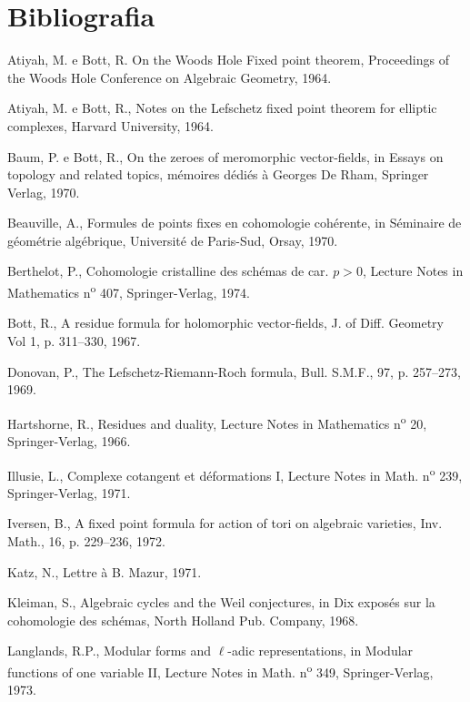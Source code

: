 \section*{Bibliografia}
\begin{enumerate}[label={[\arabic*]},leftmargin=3.5em]
\item Atiyah, M. e Bott, R. On the Woods Hole Fixed point theorem, Proceedings of the Woods Hole Conference on Algebraic Geometry, 1964.
\item Atiyah, M. e Bott, R., Notes on the Lefschetz fixed point theorem for elliptic complexes, Harvard University, 1964.
\item Baum, P. e Bott, R., On the zeroes of meromorphic vector-fields, in Essays on topology and related topics, mémoires dédiés à Georges De Rham, Springer Verlag, 1970.
\item Beauville, A., Formules de points fixes en cohomologie cohérente, in Séminaire de géométrie algébrique, Université de Paris-Sud, Orsay, 1970.
\item Berthelot, P., Cohomologie cristalline des schémas de car. $p>0$, Lecture Notes in Mathematics n\textsuperscript{o} 407, Springer-Verlag, 1974.
\item Bott, R., A residue formula for holomorphic vector-fields, J. of Diff. Geometry Vol 1, p. 311--330, 1967.
\item Donovan, P., The Lefschetz-Riemann-Roch formula, Bull. S.M.F., 97, p. 257--273, 1969.
\item Hartshorne, R., Residues and duality, Lecture Notes in Mathematics n\textsuperscript{o} 20, Springer-Verlag, 1966.
\item Illusie, L., Complexe cotangent et déformations I, Lecture Notes in Math. n\textsuperscript{o} 239, Springer-Verlag, 1971.
\item Iversen, B., A fixed point formula for action of tori on algebraic varieties, Inv. Math., 16, p. 229--236, 1972.
\item Katz, N., Lettre à B. Mazur, 1971.
\item Kleiman, S., Algebraic cycles and the Weil conjectures, in Dix exposés sur la cohomologie des schémas, North Holland Pub. Company, 1968.
\item Langlands, R.P., Modular forms and $\ell$-adic representations, in Modular functions of one variable II, Lecture Notes in Math. n\textsuperscript{o} 349, Springer-Verlag, 1973.

\end{enumerate}
